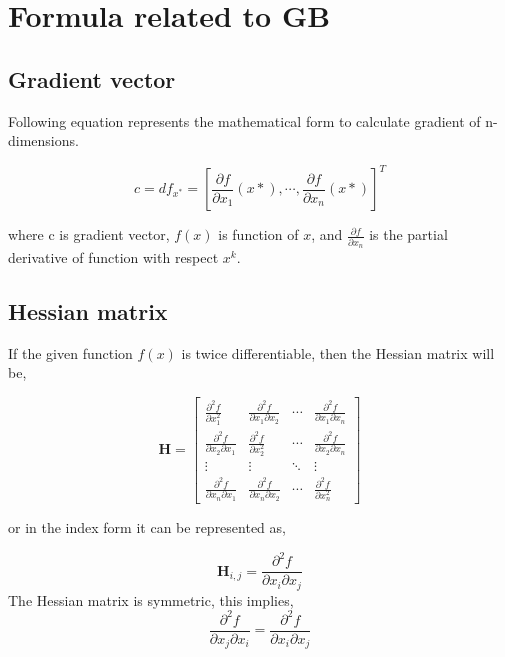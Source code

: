 \chapter{ Formula related to GB}
\label{chap:app_a}
\section{Gradient vector}
Following equation represents the mathematical form to calculate gradient of n-dimensions.

\begin{equation}
\boxed{
c = d f_{x^*}={\left[\frac{\partial f}{\partial x_{1}}(x*),  \cdots ,\frac{\partial f}{\partial x_{n}}(x*)\right]}^T
\label{gradient_vector}
}
\end{equation}


where c is gradient vector, $f(x)$ is function of $x$, and $\frac{\partial f}{\partial x_{n}}$ is the partial derivative of function with respect $x^k$.

\section{Hessian matrix}
If the given function $f(x)$ is twice differentiable, then the Hessian matrix will be,

\begin{equation}
\mathbf{H}=\left[\begin{array}{cccc}
\frac{\partial^{2} f}{\partial x_{1}^{2}} & \frac{\partial^{2} f}{\partial x_{1} \partial x_{2}} & \cdots & \frac{\partial^{2} f}{\partial x_{1} \partial x_{n}} \\
\frac{\partial^{2} f}{\partial x_{2} \partial x_{1}} & \frac{\partial^{2} f}{\partial x_{2}^{2}} & \cdots & \frac{\partial^{2} f}{\partial x_{2} \partial x_{n}} \\
\vdots & \vdots & \ddots & \vdots \\
\frac{\partial^{2} f}{\partial x_{n} \partial x_{1}} & \frac{\partial^{2} f}{\partial x_{n} \partial x_{2}} & \cdots & \frac{\partial^{2} f}{\partial x_{n}^{2}}
\end{array}\right]
\label{Hessian_matrix}
\end{equation}

or in the index form it can be represented as,

\begin{equation}
\boxed{\mathbf{H}_{i, j}=\frac{\partial^{2} f}{\partial x_{i} \partial x_{j}}}
\end{equation}
The Hessian matrix is symmetric, this implies,
 \begin{equation}
\boxed{\frac{\partial^{2} f}{\partial x_{j} \partial x_{i}}=\frac{\partial^{2} f}{\partial x_{i} \partial x_{j}}}
\end{equation}

